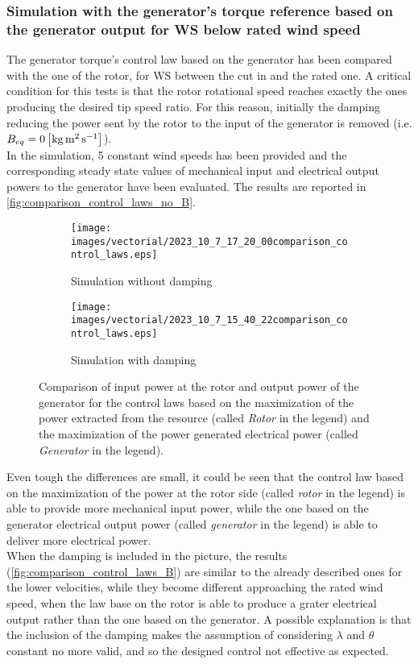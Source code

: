 \subsubsection{Simulation with the generator's torque reference based on the generator output for WS below rated wind speed}
The generator torque's control law based on the generator has been compared with the one of the rotor, for WS between the cut in and the rated one. A critical condition for this tests is that the rotor rotational speed reaches exactly the ones producing the desired tip speed ratio. For this reason, initially the damping reducing the power sent by the rotor to the input of the generator is removed (i.e. $B_{eq}=0 \left[\si{\kilo\gram\square\meter\per\second}\right]$). \\
In the simulation, 5 constant wind speeds has been provided and the corresponding steady state values of mechanical input and electrical output powers to the generator have been evaluated. The results are reported in \autoref{fig:comparison_control_laws_no_B}.
\begin{figure}[htb]
  \centering
  \begin{subfigure}{\columnwidth}
    \texttt{[image: images/vectorial/2023\_10\_7\_17\_20\_00comparison\_control\_laws.eps]}
    \caption{Simulation without damping}
    \label{fig:comparison_control_laws_no_B}
  \end{subfigure}
  \begin{subfigure}{\columnwidth}
    \texttt{[image: images/vectorial/2023\_10\_7\_15\_40\_22comparison\_control\_laws.eps]}
    \caption{Simulation with damping}
    \label{fig:comparison_control_laws_B}
  \end{subfigure}
  \caption{Comparison of input power at the rotor and output power of the generator for the control laws based on the maximization of the power extracted from the resource (called \textit{Rotor} in the legend) and the maximization of the power generated electrical power (called \textit{Generator} in the legend).}
  \label{fig:comparison_control_laws}
\end{figure}

Even tough the differences are small, it could be seen that the control law based on the maximization of the power at the rotor side (called \textit{rotor} in the legend) is able to provide more mechanical input power, while the one based on the generator electrical output power (called \textit{generator} in the legend) is able to deliver more electrical power. \\
When the damping is included in the picture, the results (\autoref{fig:comparison_control_laws_B}) are similar to the already described ones for the lower velocities, while they become different approaching the rated wind speed, when the law base on the rotor is able to produce a grater electrical output rather than the one based on the generator. A possible explanation is that the inclusion of the damping makes the assumption of considering $\lambda$ and $\theta$ constant no more valid, and so the designed control not effective as expected. 

